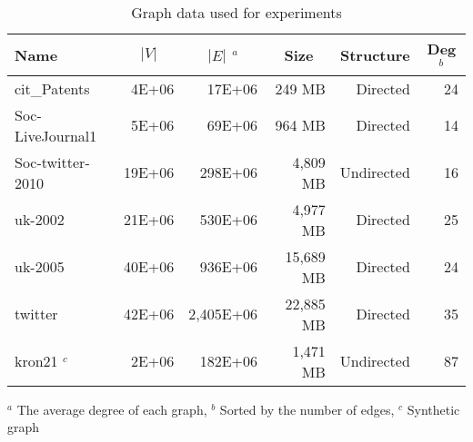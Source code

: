 \begin{table}[t]
\begin{threeparttable}
\begin{scriptsize}
 \caption{Graph data used for experiments}
 \label{tab:iter}
 \centering
\begin{tabular}{lrrrrr}
     \toprule
\multicolumn{1}{l}{Name} & \multicolumn{1}{c}{$|V|$} &
\multicolumn{1}{c}{$|E|$ $^a$} & %
\multicolumn{1}{c}{Size} & \multicolumn{1}{c}{Structure} &
\multicolumn{1}{c}{Deg $^b$} \\ %
\midrule
cit\_Patents & 4E+06 & 17E+06 & 249 MB & Directed & 24 \\
Soc-LiveJournal1 & 5E+06 & 69E+06 & 964 MB & Directed & 14 \\
Soc-twitter-2010 & 19E+06 & 298E+06 & 4,809 MB & Undirected & 16 \\
uk-2002 & 21E+06 & 530E+06 & 4,977 MB & Directed & 25 \\
uk-2005 & 40E+06 & 936E+06 & 15,689 MB & Directed & 24 \\
twitter & 42E+06 & 2,405E+06 & 22,885 MB & Directed & 35 \\
kron21 $^c$ & 2E+06 & 182E+06 & 1,471 MB & Undirected & 87 \\  %
    \bottomrule
    \end{tabular}
    \begin{tablenotes}
      \tiny
      \item {$^a$ The average degree of each graph, $^b$ Sorted by the number of edges, $^c$ Synthetic graph}
    \end{tablenotes}
 \label{tab:graphs}
\end{scriptsize}
\end{threeparttable}
\end{table}
